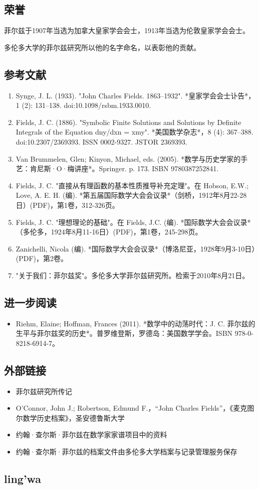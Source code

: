 \subsection{荣誉}  
菲尔兹于1907年当选为加拿大皇家学会会士，1913年当选为伦敦皇家学会会士。

多伦多大学的菲尔兹研究所以他的名字命名，以表彰他的贡献。
\subsection{参考文献}  
\begin{enumerate}
\item Synge, J. L. (1933). "John Charles Fields. 1863–1932". *皇家学会会士讣告*，1 (2): 131–138. doi:10.1098/rsbm.1933.0010.  
\item Fields, J. C. (1886). "Symbolic Finite Solutions and Solutions by Definite Integrals of the Equation dny/dxn = xmy". *美国数学杂志*，8 (4): 367–388. doi:10.2307/2369393. ISSN 0002-9327. JSTOR 2369393.  
\item Van Brummelen, Glen; Kinyon, Michael, eds. (2005). *数学与历史学家的手艺：肯尼斯·O·梅讲座*。Springer. p. 173. ISBN 9780387252841.  
\item Fields, J. C. "直接从有理函数的基本性质推导补充定理"。在 Hobson, E.W.; Love, A. E. H. (编). *第五届国际数学大会会议录*（剑桥，1912年8月22-28日）(PDF)，第1卷，312-326页。  
\item Fields, J. C. "理想理论的基础"。在 Fields, J.C. (编). *国际数学大会会议录*（多伦多，1924年8月11-16日）(PDF)，第1卷，245-298页。  
\item Zanichelli, Nicola (编). *国际数学大会会议录*（博洛尼亚，1928年9月3-10日）(PDF)，第2卷。  
\item "关于我们：菲尔兹奖"。多伦多大学菲尔兹研究所。检索于2010年8月21日。
\end{enumerate}
\subsection{进一步阅读}  
\begin{itemize}
\item Riehm, Elaine; Hoffman, Frances (2011). *数学中的动荡时代：J. C. 菲尔兹的生平与菲尔兹奖的历史*。普罗维登斯，罗德岛：美国数学学会。ISBN 978-0-8218-6914-7。
\end{itemize}
\subsection{外部链接}
\begin{itemize}
\item 菲尔兹研究所传记  
\item O'Connor, John J.; Robertson, Edmund F.，“John Charles Fields”，《麦克图尔数学历史档案》，圣安德鲁斯大学  
\item 约翰·查尔斯·菲尔兹在数学家家谱项目中的资料  
\item 约翰·查尔斯·菲尔兹的档案文件由多伦多大学档案与记录管理服务保存
\end{itemize}
\subsection{ling'wa}